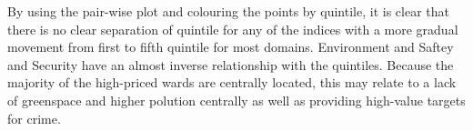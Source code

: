 By using the pair-wise plot and colouring the points by quintile, it is clear that there is no clear separation of quintile for any of the indices with a more gradual movement from first to fifth quintile for most domains. Environment and Saftey and Security have an almost inverse relationship with the quintiles. Because the majority of the high-priced wards are centrally located, this may relate to a lack of greenspace and higher polution centrally as well as providing high-value targets for crime. 